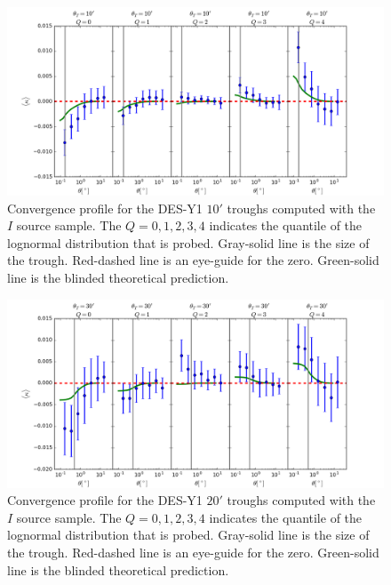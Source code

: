\begin{figure}
\includegraphics[width=\textwidth]{./figures_y1/troughs_ap10_mag_auto_i1.png}
\caption{Convergence profile for the DES-Y1 $10'$ troughs computed with the $I$ source sample. The $Q=0,1,2,3,4$ indicates the quantile of the lognormal distribution that is probed. Gray-solid line is the size of the trough. Red-dashed line is an eye-guide for the zero. Green-solid line is the blinded theoretical prediction.}
\label{fig:troughs_ap10}
\end{figure}
\begin{figure}
\includegraphics[width=\textwidth]{./figures_y1/troughs_ap30_mag_auto_i1.png}
\caption{Convergence profile for the DES-Y1 $20'$ troughs computed with the $I$ source sample. The $Q=0,1,2,3,4$ indicates the quantile of the lognormal distribution that is probed. Gray-solid line is the size of the trough. Red-dashed line is an eye-guide for the zero. Green-solid line is the blinded theoretical prediction.}
\label{fig:troughs_ap20}
\end{figure}
